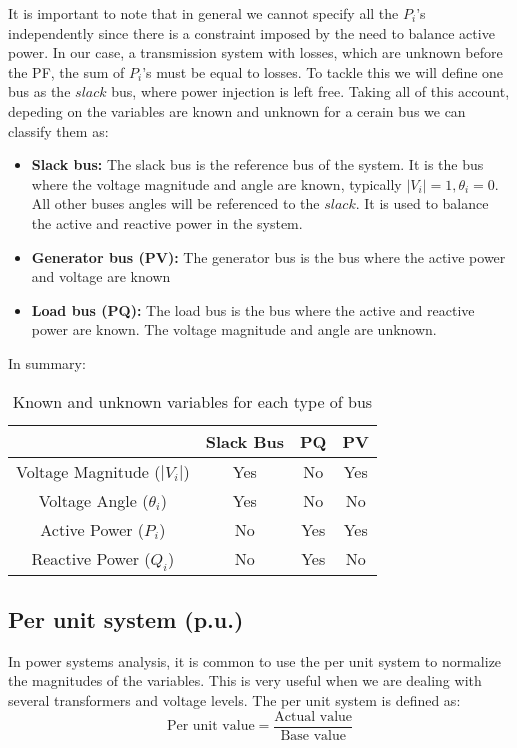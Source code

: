 \documentclass[a4paper,11pt, titlepage, twoside]{article}
\begin{document}
It is important to note that in general we cannot specify all the $P_i$'s independently since there is a constraint imposed by the need to balance active power. In our case, a transmission system with losses, which are unknown before the PF,
the sum of $P_i$'s must be equal to losses. To tackle this we will define one bus as the $slack$ bus, where power injection is left free. Taking all of this account, depeding on the variables are known and unknown for a cerain bus we can classify them as:
\begin{itemize}
    \item \textbf{Slack bus:} The slack bus is the reference bus of the system. It is the bus where the voltage magnitude and angle are known, typically $|V_i|= 1, \theta_i= 0 $.
    All other buses angles will be referenced to the $slack$. It is used to balance the active and reactive power in the system.
    \item \textbf{Generator bus (PV):} The generator bus is the bus where the active power and voltage are known
    \item \textbf{Load bus (PQ):} The load bus is the bus where the active and reactive power are known. The voltage magnitude and angle are unknown.
\end{itemize}
In summary:
\begin{table}[h]
    \centering
    \begin{tabular}{|c|c|c|c|}
        \hline
        & Slack Bus & PQ & PV \\
        \hline
        Voltage Magnitude ($|V_i|$) & Yes & No & Yes \\
        \hline
        Voltage Angle ($\theta_i$) & Yes & No & No \\
        \hline
        Active Power ($P_i$) & No & Yes & Yes \\
        \hline
        Reactive Power ($Q_i$) & No & Yes & No \\
        \hline
    \end{tabular}
    \caption{Known and unknown variables for each type of bus}
    \label{tab:bus_variables}
\end{table}





\subsection{Per unit system (p.u.)}

In power systems analysis, it is common to use the per unit system to normalize the magnitudes of the variables. This is very useful when we are dealing with several transformers and voltage levels. 
The per unit system is defined as:
\begin{equation}
    \text{Per unit value} = \frac{\text{Actual value}}{\text{Base value}}
\end{equation}
\end{document}

